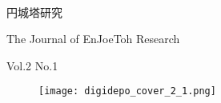 \documentclass[10pt, a5paper, twoside]{jsarticle}
\theoremstyle{definition}
\begin{document}
	\begin{center}

		~

		\fontsize{43pt}{20mm}\selectfont
		円城塔研究

		\vspace{3mm}

		\LARGE{The Journal of EnJoeToh Research}

		\vspace{3mm}

		\normalsize{Vol.2 No.1}

	\end{center}

	\vspace{10mm}

	\begin{figure}[h]

		\texttt{[image: digidepo\_cover\_2\_1.png]}
		
	\end{figure}{}

	\newpage

	\thispagestyle{empty}
	
	~
	
	\newpage
\end{document}
